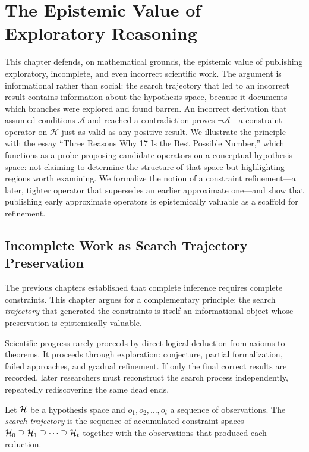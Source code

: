 \chapter{The Epistemic Value of Exploratory Reasoning}
\label{ch:exploratory}

This chapter defends, on mathematical grounds, the epistemic value of publishing exploratory, incomplete, and even incorrect scientific work. The argument is informational rather than social: the search trajectory that led to an incorrect result contains information about the hypothesis space, because it documents which branches were explored and found barren. An incorrect derivation that assumed conditions $\mathcal{A}$ and reached a contradiction proves $\neg\mathcal{A}$---a constraint operator on $\mathcal{H}$ just as valid as any positive result. We illustrate the principle with the essay ``Three Reasons Why 17 Is the Best Possible Number,'' which functions as a probe proposing candidate operators on a conceptual hypothesis space: not claiming to determine the structure of that space but highlighting regions worth examining. We formalize the notion of a constraint refinement---a later, tighter operator that supersedes an earlier approximate one---and show that publishing early approximate operators is epistemically valuable as a scaffold for refinement.



\section{Incomplete Work as Search Trajectory Preservation}

The previous chapters established that complete inference requires complete constraints. This chapter argues for a complementary principle: the search \emph{trajectory} that generated the constraints is itself an informational object whose preservation is epistemically valuable.

Scientific progress rarely proceeds by direct logical deduction from axioms to theorems. It proceeds through exploration: conjecture, partial formalization, failed approaches, and gradual refinement. If only the final correct results are recorded, later researchers must reconstruct the search process independently, repeatedly rediscovering the same dead ends.

\begin{definition}
Let $\mathcal{H}$ be a hypothesis space and $o_1, o_2, \ldots, o_t$ a sequence of observations. The \emph{search trajectory} is the sequence of accumulated constraint spaces $\mathcal{H}_0 \supseteq \mathcal{H}_1 \supseteq \cdots \supseteq \mathcal{H}_t$ together with the observations that produced each reduction.
\end{definition}


